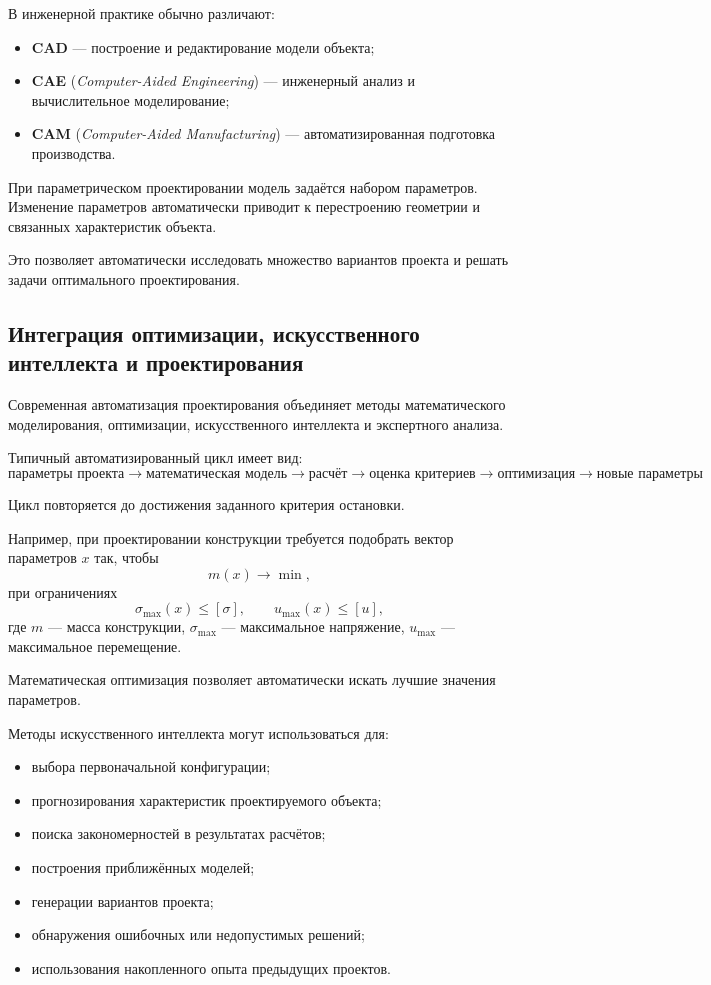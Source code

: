 В инженерной практике обычно различают:
\begin{itemize}
	\item \textbf{CAD} --- построение и редактирование модели объекта;
	\item \textbf{CAE} (\textit{Computer-Aided Engineering}) --- инженерный анализ и вычислительное моделирование;
	\item \textbf{CAM} (\textit{Computer-Aided Manufacturing}) --- автоматизированная подготовка производства.
\end{itemize}

При параметрическом проектировании модель задаётся набором параметров. Изменение параметров автоматически приводит к перестроению геометрии и связанных характеристик объекта.

Это позволяет автоматически исследовать множество вариантов проекта и решать задачи оптимального проектирования.

\subsection{Интеграция оптимизации, искусственного интеллекта и проектирования}

Современная автоматизация проектирования объединяет методы математического моделирования, оптимизации, искусственного интеллекта и экспертного анализа.

Типичный автоматизированный цикл имеет вид:
\[
\boxed{
	\text{параметры проекта}
	\rightarrow
	\text{математическая модель}
	\rightarrow
	\text{расчёт}
	\rightarrow
	\text{оценка критериев}
	\rightarrow
	\text{оптимизация}
	\rightarrow
	\text{новые параметры}
}
\]

Цикл повторяется до достижения заданного критерия остановки.

Например, при проектировании конструкции требуется подобрать вектор параметров $x$ так, чтобы
\[
m(x)\rightarrow\min,
\]
при ограничениях
\[
\sigma_{\max}(x)\leq[\sigma],
\qquad
u_{\max}(x)\leq[u],
\]
где $m$ --- масса конструкции, $\sigma_{\max}$ --- максимальное напряжение, $u_{\max}$ --- максимальное перемещение.

Математическая оптимизация позволяет автоматически искать лучшие значения параметров.

Методы искусственного интеллекта могут использоваться для:
\begin{itemize}
	\item выбора первоначальной конфигурации;
	\item прогнозирования характеристик проектируемого объекта;
	\item поиска закономерностей в результатах расчётов;
	\item построения приближённых моделей;
	\item генерации вариантов проекта;
	\item обнаружения ошибочных или недопустимых решений;
	\item использования накопленного опыта предыдущих проектов.
\end{itemize}

